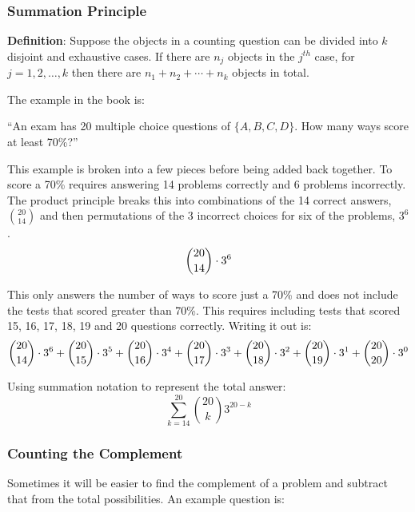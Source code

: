 \documentclass{article}
\begin{document}
\subsubsection{Summation Principle}

\textbf{Definition}: Suppose the objects in a counting question can be divided into $k$ disjoint and exhaustive cases. If there are $n_j$ objects in the $j^{th}$ case, for $j=1, 2, \dots, k$ then there are $n_1 + n_2 + \cdots + n_{k}$ objects in total. \medskip

The example in the book is:

\begin{center}
    ``An exam has 20 multiple choice questions of $\{A, B, C, D\}$. How many ways score at least 70\%?''
\end{center}

This example is broken into a few pieces before being added back together. To score a 70\% requires answering 14 problems correctly and 6 problems incorrectly. The product principle breaks this into combinations of the 14 correct answers, $\binom{20}{14}$ and then permutations of the 3 incorrect choices for six of the problems, $3^{6}$.
\begin{equation*}
    \dbinom{20}{14} \cdot 3^6
\end{equation*}

This only answers the number of ways to score just a 70\% and does not include the tests that scored greater than 70\%. This requires including tests that scored 15, 16, 17, 18, 19 and 20 questions correctly. Writing it out is:
\begin{equation*}
    \dbinom{20}{14} \cdot 3^6 + \dbinom{20}{15} \cdot 3^5 + \dbinom{20}{16} \cdot 3^4 + \dbinom{20}{17} \cdot 3^3 +
    \dbinom{20}{18} \cdot 3^2 + \dbinom{20}{19} \cdot 3^1 + \dbinom{20}{20} \cdot 3^0
\end{equation*}

Using summation notation to represent the total answer:
\begin{equation*}
    \sum_{k=14}^{20} \binom{20}{k} 3^{20-k}
\end{equation*}

\subsubsection{Counting the Complement}
Sometimes it will be easier to find the complement of a problem and subtract that from the total possibilities. An example question is:
\end{document}
